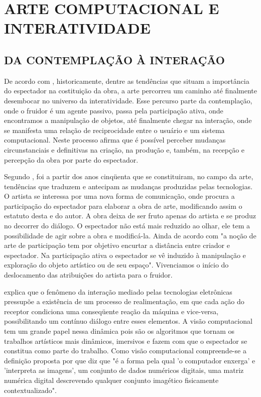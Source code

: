 \chapter{ARTE COMPUTACIONAL E INTERATIVIDADE}

\section{DA CONTEMPLAÇÃO À INTERAÇÃO}

De acordo com , historicamente, dentre as tendências que situam a importância do espectador na costituição da obra, a arte percorreu um caminho até finalmente desembocar no universo da interatividade. Esse percurso parte da contemplação, onde o fruidor é um agente passivo, passa pela participação ativa, onde encontramos a manipulação de objetos, até finalmente chegar na interação, onde se manifesta uma relação de reciprocidade entre o usuário e um sistema computacional. Neste processo  afirma que é possível perceber mudanças circunstanciais e definitivas na criação, na produção e, também, na recepção e percepção da obra por parte do espectador. 

Segundo , foi a partir dos anos cinqüenta que se constituiram, no campo da arte, tendências que traduzem e antecipam as mudanças produzidas pelas tecnologias. O artista se interessa por uma nova forma de comunicação, onde procura a participação do espectador para elaborar a obra de arte, modificando assim o estatuto desta e do autor. A obra deixa de ser fruto apenas do artista e se produz no decorrer do diálogo. O espectador não está mais reduzido ao olhar, ele tem a possibilidade de agir sobre a obra e modificá-la. Ainda de acordo com  "a noção de arte de participação tem por objetivo encurtar a distância entre criador e espectador. Na participação ativa o espectador se vê induzido à manipulação e exploração do objeto artístico ou de seu espaço". Vivenciamos o início do deslocamento das atribuições do artista para o fruidor. 

 explica que o fenômeno da interação mediado pelas tecnologias eletrônicas pressupõe a existência de um processo de realimentação, em que cada ação do receptor condiciona uma conseqüente reação da máquina e vice-versa, possibilitando um contínuo diálogo entre esses elementos. A visão computacional tem um grande papel nessa dinâmica pois são os algoritmos que tornam os trabalhos artísticos mais dinâmicos, imersivos e fazem com que o espectador se constitua como parte do trabalho. Como visão computacional compreende-se a definição proposta por  que diz que "é a forma pela qual 'o computador enxerga' e 'interpreta as imagens', um conjunto de dados numéricos digitais, uma matriz numérica digital descrevendo qualquer conjunto imagético fisicamente contextualizado".

